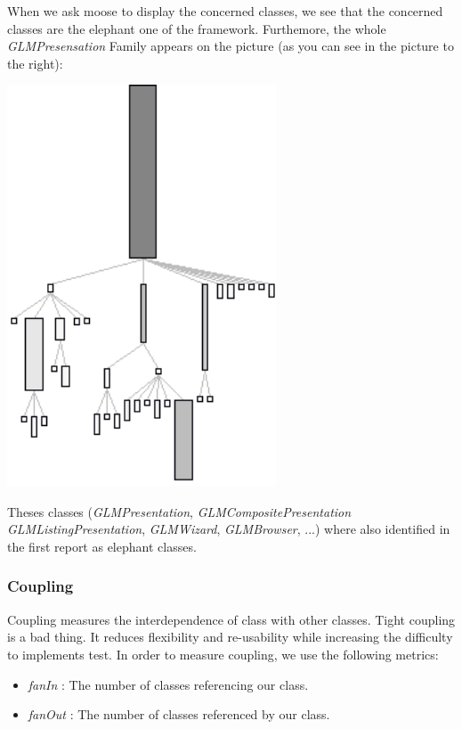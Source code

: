 \documentclass[11pt,a4paper]{article}
\begin{document}
\begin{minipage}[t]{0.4\textwidth}
When we ask moose to display the concerned classes, we see that the concerned classes are the elephant one of the framework. Furthemore, the whole \textit{GLMPresensation} Family appears on the picture (as you can see in the picture to the right):

\end{minipage}
\hfill
\begin{minipage}[t]{0.6\textwidth}
    \centering
     \vspace{-1.5ex}
\includegraphics[width=0.6\textwidth]{GLMPresentation_family}
\end{minipage} 


Theses classes (\textit{GLMPresentation}, \textit{GLMCompositePresentation} \textit{GLMListingPresentation}, \textit{GLMWizard}, \textit{GLMBrowser}, ...)  where also identified in the first report as elephant  classes.\\
\subsubsection{Coupling}
Coupling measures the interdependence of class with other classes. Tight coupling is a bad thing. It reduces flexibility and re-usability while increasing the difficulty to implements test. In order to measure coupling, we use the following metrics:
\begin{itemize}
\item \textit{fanIn} : The number of classes referencing our class.
\item \textit{fanOut} : The number of classes referenced by our class.
\end{itemize} 
\end{document}
